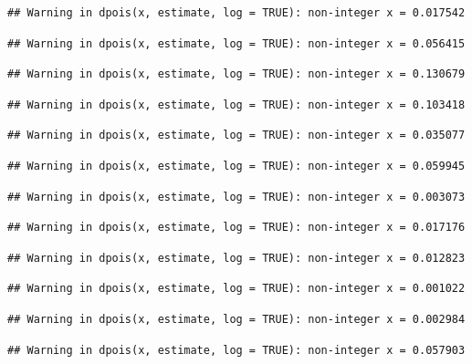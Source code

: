 \documentclass[]{article}
\begin{document}
\begin{verbatim}
## Warning in dpois(x, estimate, log = TRUE): non-integer x = 0.017542
\end{verbatim}

\begin{verbatim}
## Warning in dpois(x, estimate, log = TRUE): non-integer x = 0.056415
\end{verbatim}

\begin{verbatim}
## Warning in dpois(x, estimate, log = TRUE): non-integer x = 0.130679
\end{verbatim}

\begin{verbatim}
## Warning in dpois(x, estimate, log = TRUE): non-integer x = 0.103418
\end{verbatim}

\begin{verbatim}
## Warning in dpois(x, estimate, log = TRUE): non-integer x = 0.035077
\end{verbatim}

\begin{verbatim}
## Warning in dpois(x, estimate, log = TRUE): non-integer x = 0.059945
\end{verbatim}

\begin{verbatim}
## Warning in dpois(x, estimate, log = TRUE): non-integer x = 0.003073
\end{verbatim}

\begin{verbatim}
## Warning in dpois(x, estimate, log = TRUE): non-integer x = 0.017176
\end{verbatim}

\begin{verbatim}
## Warning in dpois(x, estimate, log = TRUE): non-integer x = 0.012823
\end{verbatim}

\begin{verbatim}
## Warning in dpois(x, estimate, log = TRUE): non-integer x = 0.001022
\end{verbatim}

\begin{verbatim}
## Warning in dpois(x, estimate, log = TRUE): non-integer x = 0.002984
\end{verbatim}

\begin{verbatim}
## Warning in dpois(x, estimate, log = TRUE): non-integer x = 0.057903
\end{verbatim}
\end{document}
